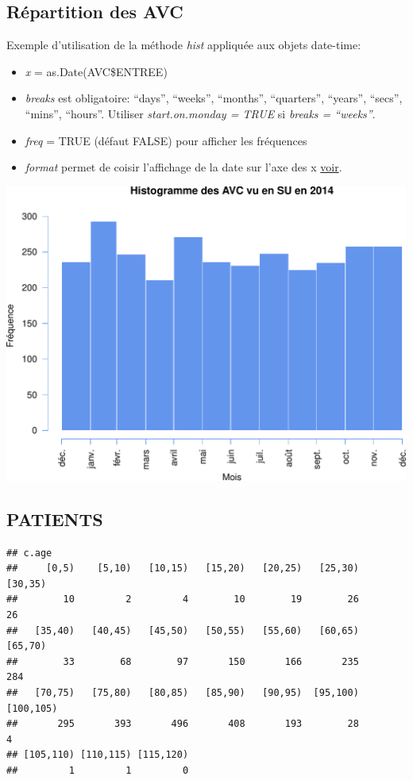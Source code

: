 \documentclass[]{article}
\begin{document}
\subsection{Répartition des AVC}\label{repartition-des-avc}

Exemple d'utilisation de la méthode \emph{hist} appliquée aux objets
date-time:

\begin{itemize}
\itemsep1pt\parskip0pt
\item
  \emph{x} = as.Date(AVC\$ENTREE)
\item
  \emph{breaks} est obligatoire: ``days'', ``weeks'', ``months'',
  ``quarters'', ``years'', ``secs'', ``mins'', ``hours''. Utiliser
  \emph{start.on.monday = TRUE} si \emph{breaks = ``weeks''}.
\item
  \emph{freq} = TRUE (défaut FALSE) pour afficher les fréquences
\item
  \emph{format} permet de coisir l'affichage de la date sur l'axe des x
  \href{https://stat.ethz.ch/R-manual/R-devel/library/base/html/strptime.html}{voir}.
\end{itemize}

\includegraphics{rapport2014_V4_files/figure-latex/hist_avc-1.pdf}

\subsection{PATIENTS}\label{patients-3}

\begin{verbatim}
## c.age
##     [0,5)    [5,10)   [10,15)   [15,20)   [20,25)   [25,30)   [30,35) 
##        10         2         4        10        19        26        26 
##   [35,40)   [40,45)   [45,50)   [50,55)   [55,60)   [60,65)   [65,70) 
##        33        68        97       150       166       235       284 
##   [70,75)   [75,80)   [80,85)   [85,90)   [90,95)  [95,100) [100,105) 
##       295       393       496       408       193        28         4 
## [105,110) [110,115) [115,120) 
##         1         1         0
\end{verbatim}
\end{document}
